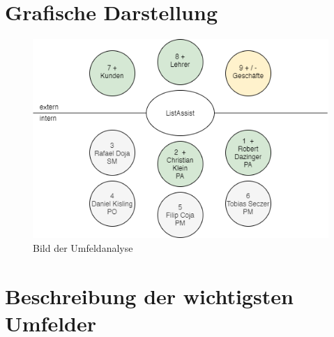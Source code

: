 \hypertarget{grafische-darstellung}{%
\section{Grafische Darstellung}\label{grafische-darstellung}}

\begin{figure}
\centering
\includegraphics{images/doja/umweltanalyse.png}
\caption{Bild der Umfeldanalyse}
\end{figure}

\hypertarget{beschreibung-der-wichtigsten-umfelder}{%
\section{Beschreibung der wichtigsten
Umfelder}\label{beschreibung-der-wichtigsten-umfelder}}

